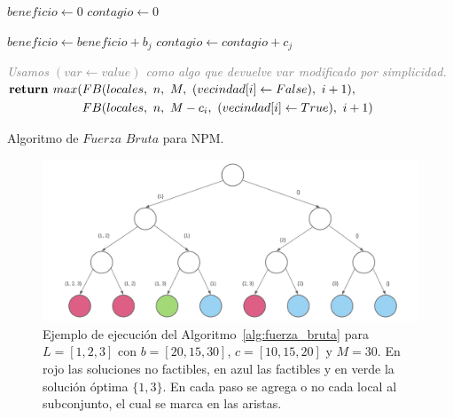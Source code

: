 \begin{algorithm}
    \begin{algorithmic}[1]
                \State $beneficio \gets 0$
                \State $contagio \gets 0$
                     
                    \EndIf
                    
                     
                        \State $beneficio \gets beneficio + b_j$
                        \State $contagio \gets contagio + c_j$
                    \EndIf
                    
                    \EndIf
                    
                \EndFor
            \Else 
                \State \textcolor{gray}{\textit{Usamos $(var \gets value)$ como algo que devuelve $var$ modificado por simplicidad.}}
                \State $\begin{aligned}[t]
                    \text{\textbf{return }} max(&FB(locales,\ n,\ M,\ (vecindad[i] \gets False),\ i+1),\\
                    &FB(locales,\ n,\ M - c_i,\ (vecindad[i] \gets True),\ i+1)&
                \end{aligned}$
            \EndIf
        \EndFunction
    \end{algorithmic}
    \caption{Algoritmo de $Fuerza$ $Bruta$ para NPM.}
    \label{alg:fuerza_bruta}
\end{algorithm}

\begin{figure}[H]
    \centering
    \includegraphics[scale=0.15]{img/Tree-Locales.png}
    \caption{Ejemplo de ejecución del Algoritmo~\ref{alg:fuerza_bruta} para $L=[1,2,3]$ con $b=[20,15,30]$, $c=[10, 15, 20]$ y $M=30$. En rojo las soluciones no factibles, en azul las factibles y en verde la solución óptima $\{1, 3\}$. En cada paso se agrega o no cada local al subconjunto, el cual se marca en las aristas.}
    \label{fig:ejemplo_fuerza_bruta}
\end{figure}

